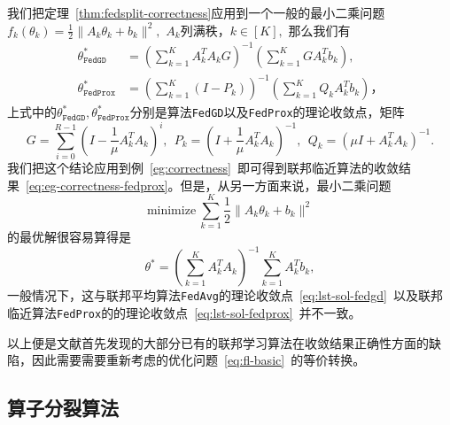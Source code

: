 \begin{rem}
我们把定理~\ref{thm:fedsplit-correctness}应用到一个一般的最小二乘问题$f_k(\theta_k) = \frac{1}{2}\lVert A_k \theta_k + b_k \rVert^2,$ $A_k$列满秩，$k \in [K],$ 那么我们有
\begin{subequations}
\label{eq:lst-sol}
\begin{align}
\theta^*_{\texttt{FedGD}} & = \left( \sum\limits_{k=1}^K A_k^TA_k G \right)^{-1}\left( \sum\limits_{k=1}^K GA_k^Tb_k \right), \label{eq:lst-sol-fedgd} \\
\theta^*_{\texttt{FedProx}} & = \left( \sum\limits_{k=1}^K \left( I - P_k \right) \right)^{-1} \left( \sum\limits_{k=1}^K Q_kA_k^Tb_k \right)， \label{eq:lst-sol-fedprox}
\end{align}
\end{subequations}
上式中的$\theta^*_{\texttt{FedGD}}, \theta^*_{\texttt{FedProx}}$分别是算法\texttt{FedGD}以及\texttt{FedProx}的理论收敛点，矩阵
\begin{equation*}
G = \sum\limits_{i=0}^{R-1} ( I - \frac{1}{\mu} A_k^TA_k )^i, ~~ P_k = ( I + \frac{1}{\mu} A_k^TA_k )^{-1}, ~~ Q_k = (\mu I + A_k^TA_k)^{-1}.
\end{equation*}
我们把这个结论应用到例~\ref{eg:correctness}~即可得到联邦临近算法的收敛结果~\eqref{eq:eg-correctness-fedprox}。但是，从另一方面来说，最小二乘问题
\begin{equation*}
\text{minimize} ~ \sum\limits_{k=1}^K \frac{1}{2}\lVert A_k \theta_k + b_k \rVert^2
\end{equation*}
的最优解很容易算得是
\begin{equation*}
\theta^* = \left( \sum_{k=1}^K A_k^TA_k \right)^{-1} \sum_{k=1}^K A_k^Tb_k,
\end{equation*}
一般情况下，这与联邦平均算法\texttt{FedAvg}的理论收敛点~\eqref{eq:lst-sol-fedgd}~以及联邦临近算法\texttt{FedProx}的的理论收敛点~\eqref{eq:lst-sol-fedprox}~并不一致。
\end{rem}

以上便是文献\parencite{pathak2020fedsplit}首先发现的大部分已有的联邦学习算法在收敛结果正确性方面的缺陷，因此需要需要重新考虑的优化问题~\eqref{eq:fl-basic}~的等价转换。

\subsection{算子分裂算法}
\label{subsec:chap2-os-alg}

